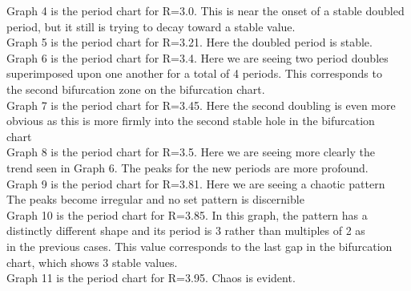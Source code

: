 \documentclass{amsart}
\begin{document}
Graph 4 is the period chart for R=3.0.  This is near the onset of a stable doubled\\
period, but it still is trying to decay toward a stable value.\\

Graph 5 is the period chart for R=3.21.  Here the doubled period is stable.\\

Graph 6 is the period chart for R=3.4.  Here we are seeing two period doubles \\
superimposed upon one another for a total of 4 periods.  This corresponds to \\
the second bifurcation zone on the bifurcation chart.\\

Graph 7 is the period chart for R=3.45.  Here the second doubling is even more\\
obvious as this is more firmly into the second stable hole in the bifurcation\\
chart\\

Graph 8 is the period chart for R=3.5.  Here we are seeing more clearly the\\
trend seen in Graph 6.  The peaks for the new periods are more profound.\\


Graph 9 is the period chart for R=3.81.  Here we are seeing a chaotic pattern\\
The peaks become irregular and no set pattern is discernible\\


Graph 10 is the period chart for R=3.85.  In this graph, the pattern has a \\
distinctly different shape and its period is 3 rather than multiples of 2 as\\
in the previous cases.  This value corresponds to the last gap in the bifurcation\\
chart, which shows 3 stable values.\\


Graph 11 is the period chart for R=3.95. Chaos is evident.\\
\end{document}
